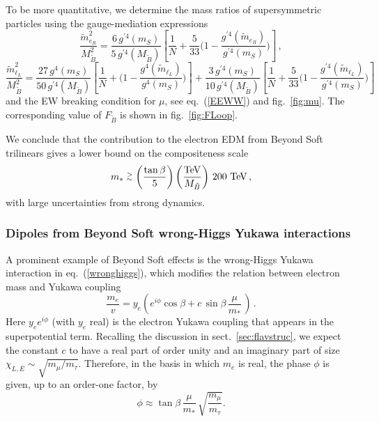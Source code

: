 \documentclass[a4paper,12pt]{article}
\newcommand{\gsim}{\stackrel{>}{_\sim}}
\newcommand{\beq}{\begin{equation}}
\newcommand{\eeq}{\end{equation}}
\def\eq#1{eq.~(\ref{#1})}
\def\fig#1{fig.~\ref{#1}}
\def\eq#1{eq.~(\ref{#1})}
\def\fig#1{fig.~\ref{#1}}
\def\sec#1{sect.~\ref{#1}}
\def\mst{m_*}
\def\mS{m_S}
\begin{document}
{{{{To be more quantitative, we determine the mass ratios of supersymmetric particles using the gauge-mediation expressions
\beq
\frac{{\tilde m}_{e_R}^2}{M^2_{\tilde B}}=\frac{6\, g^{\prime 4}(\mS)}{5\, g^{\prime 4}(M_{\tilde B})}
\left[ \frac1N +\frac{5}{33}\Big( 1-\frac{g^{\prime 4}({\tilde m}_{e_R})}{g^{\prime 4}(\mS)}\Big) \right] \, ,
\label{GM1}
\eeq
\beq
\frac{{\tilde m}_{{ \ell}_L}^2}{M^2_{\tilde B}}=\frac{27\, g^{ 4}(\mS)}{50\, g^{\prime 4}(M_{\tilde B})}
\left[ \frac1N +\Big( 1-\frac{g^{ 4}({\tilde m}_{{ \ell}_L})}{g^{ 4}(\mS)}\Big) \right] 
+\frac{3\, g^{\prime 4}(\mS)}{10\, g^{\prime 4}(M_{\tilde B})}
\left[ \frac1N +
\frac{5}{33}\Big( 1-\frac{g^{\prime 4}({\tilde m}_{{ \ell}_L})}{g^{\prime 4}(\mS)}\Big) \right] 
\label{GM2}
\eeq
and the EW breaking condition for $\mu$, see \eq{EEWW} and \fig{fig:mu}. The corresponding value of $F_{\tilde B}$ is shown in \fig{fig:FLoop}.

We conclude that the contribution to the electron EDM from Beyond Soft trilinears gives a lower bound on the compositeness scale
\beq
\mst \gsim \left(\frac{\tan \beta}{5}\right) \left( \frac{\rm TeV}{M_{\tilde B}}\right)\, 200~{\rm TeV}\, ,
\label{limEDMtr}
\eeq
with large uncertainties from strong dynamics.

\subsubsection*{Dipoles from Beyond Soft wrong-Higgs Yukawa interactions}

A prominent example of Beyond Soft effects is the wrong-Higgs Yukawa interaction in \eq{wronghiggs}, which modifies the relation between electron mass and Yukawa coupling
\beq
\frac{m_e}{v} = y_e \left( e^{i\phi}\cos\beta +c\, \sin\beta\, \frac{\mu}{m_*}\,\right) \, .
\label{wHrel}
\eeq
Here $y_e e^{i\phi}$ (with $y_e$ real) is the electron Yukawa coupling that appears in the superpotential term. Recalling the discussion in \sec{sec:flavstruc}, we expect the constant $c$ to have a real part of order unity and an imaginary part of size $\chi_{L,\bar E} \sim \sqrt{m_\mu /m_\tau}$. Therefore, in the basis in which $m_e$ is real, the phase $\phi$ is given, up to an order-one factor, by
\beq
\phi \approx \tan\beta \, \frac{\mu}{m_*}\, \sqrt{\frac{m_\mu}{m_\tau}}.
\eeq

}}}}
\end{document}
